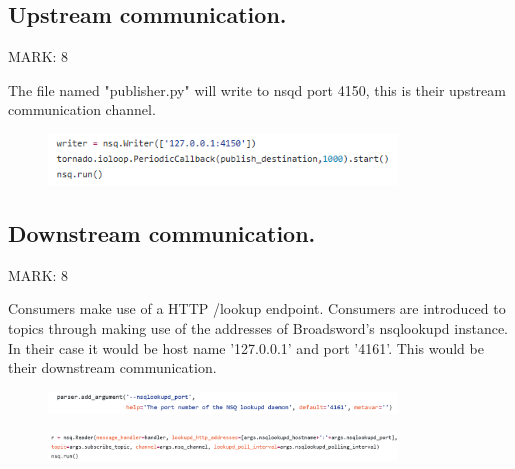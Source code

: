 \documentclass{article}
\begin{document}
\subsection{Upstream communication.}
\begin{flushleft}
MARK: 8
\end{flushleft}

\begin{flushleft}
The file named "publisher.py" will write to nsqd port 4150, this is their upstream communication channel.
\end{flushleft}


\begin{figure}[ht]
  \includegraphics[width=350px]{Images/publisher.PNG}  
\end{figure}

\subsection{Downstream communication.}
\begin{flushleft}
MARK: 8
\end{flushleft}

\begin{flushleft}
Consumers make use of a HTTP /lookup endpoint. Consumers are introduced to topics through making use of the addresses of Broadsword's nsqlookupd instance. In their case it would be host name '127.0.0.1' and port '4161'. This would be their downstream communication.
\end{flushleft}


\begin{figure}[ht]
  \includegraphics[width=350px]{Images/readerInitialize.PNG}  
\end{figure}

\begin{figure}[ht]
  \includegraphics[width=350px]{Images/readerExecute.PNG}  
\end{figure}
\end{document}
